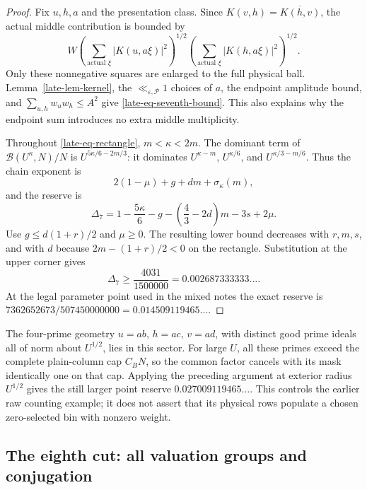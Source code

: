 \documentclass[11pt]{article}
\theoremstyle{definition}
\newcommand{\eps}{\varepsilon}
\newcommand{\lls}{\ll_{\eps,\mathcal P}}
\begin{document}
\begin{proof}
Fix $u,h,a$ and the presentation class.  Since
$K(v,h)=\overline{K(h,v)}$, the actual middle contribution is bounded
by
\[
 W\left(\sum_{\text{actual }\xi}|K(u,a\xi)|^2\right)^{1/2}
   \left(\sum_{\text{actual }\xi}|K(h,a\xi)|^2\right)^{1/2}.
\]
Only these nonnegative squares are enlarged to the full physical ball.
Lemma~\ref{late-lem-kernel}, the $\lls1$ choices of $a$, the endpoint
amplitude bound, and $\sum_{u,h}w_uw_h\le A^2$ give
\eqref{late-eq-seventh-bound}.  This also explains why the endpoint
sum introduces no extra middle multiplicity.

Throughout \eqref{late-eq-rectangle}, $m<\kappa<2m$.  The dominant
term of $\mathcal B(U^\kappa,N)/N$ is
$U^{5\kappa/6-2m/3}$: it dominates $U^{\kappa-m}$,
$U^{\kappa/6}$, and $U^{\kappa/3-m/6}$.  Thus the chain exponent is
\[
 2(1-\mu)+g+dm+\sigma_\kappa(m),
\]
and the reserve is
\begin{equation}
 \Delta_7=1-\frac{5\kappa}{6}-g-
                  \left(\frac43-2d\right)m-3s+2\mu.
 \label{late-eq-delta7}
\end{equation}
Use $g\le d(1+r)/2$ and $\mu\ge0$.  The resulting lower bound
decreases with $r,m,s$, and with $d$ because
$2m-(1+r)/2<0$ on the rectangle.  Substitution at the upper corner
gives
\[
 \Delta_7\ge\frac{4031}{1500000}
                    =0.002687333333\ldots.
\]
At the legal parameter point used in the mixed notes the exact reserve
is $7362652673/507450000000=0.014509119465\ldots$.
\end{proof}

The four-prime geometry $u=ab$, $h=ac$, $v=ad$, with distinct good
prime ideals all of norm about $U^{1/2}$, lies in this sector.  For
large $U$, all these primes exceed the complete plain-column cap
$C_BN$, so the common factor cancels with its mask identically one
on that cap.  Applying the preceding argument at exterior radius
$U^{1/2}$ gives the still larger point reserve
$0.027009119465\ldots$.  This controls the earlier raw counting
example; it does not assert that its physical rows populate a chosen
zero-selected bin with nonzero weight.

\subsection{The eighth cut: all valuation groups and conjugation}
\label{late-subsec-eighth}
\end{document}
